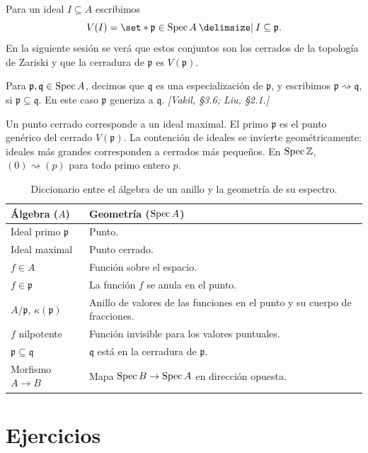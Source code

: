 Para un ideal $I\subseteq A$ escribimos
\[
V(I)=\set*{\mathfrak p\in\Spec A \given I\subseteq\mathfrak p}.
\]
En la siguiente sesión se verá que estos conjuntos son los cerrados de la topología de Zariski y que la cerradura de $\mathfrak p$ es $V(\mathfrak p)$.

\begin{defi}[Especialización]
\label{defi:s01-especializacion}
Para $\mathfrak p,\mathfrak q\in\operatorname{Spec} A$, decimos que $\mathfrak q$ es una especialización de $\mathfrak p$, y escribimos $\mathfrak p\rightsquigarrow\mathfrak q$, si $\mathfrak p\subseteq\mathfrak q$. En este caso $\mathfrak p$ generiza a $\mathfrak q$. \emph{[Vakil, \S3.6; Liu, \S2.1.]}
\end{defi}

Un punto cerrado corresponde a un ideal maximal. El primo $\mathfrak p$ es el punto genérico del cerrado $V(\mathfrak p)$. La contención de ideales se invierte geométricamente: ideales más grandes corresponden a cerrados más pequeños. En $\operatorname{Spec}\mathbb Z$, $(0)\rightsquigarrow(p)$ para todo primo entero $p$.

\begin{table}[H]
\centering
\renewcommand{\arraystretch}{1.17}
\begin{tabular}{@{}l p{.60\linewidth}@{}}
\textbf{Álgebra} ($A$) & \textbf{Geometría} ($\operatorname{Spec} A$) \\
\hline
Ideal primo $\mathfrak p$ & Punto. \\
Ideal maximal & Punto cerrado. \\
$f\in A$ & Función sobre el espacio. \\
$f\in\mathfrak p$ & La función $f$ se anula en el punto. \\
$A/\mathfrak p$, $\kappa(\mathfrak p)$ & Anillo de valores de las funciones en el punto y su cuerpo de fracciones. \\
$f$ nilpotente & Función invisible para los valores puntuales. \\
$\mathfrak p\subseteq\mathfrak q$ & $\mathfrak q$ está en la cerradura de $\mathfrak p$. \\
Morfismo $A\to B$ & Mapa $\operatorname{Spec} B\to\operatorname{Spec} A$ en dirección opuesta.
\end{tabular}
\caption{Diccionario entre el álgebra de un anillo y la geometría de su espectro.}
\label{tab:s01-diccionario-algebra-geometria}
\end{table}

\section{Ejercicios}

